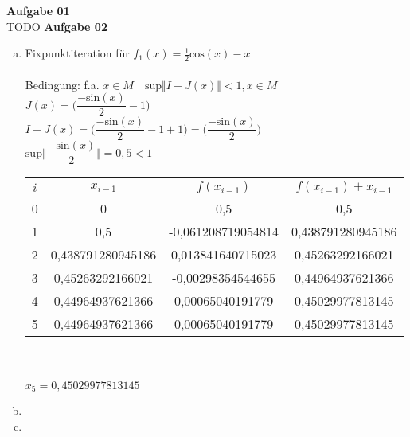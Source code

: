 \documentclass[a4paper,10pt]{article}
\begin{document}
	\parindent0pt
	\textbf{Aufgabe 01}\\
	TODO
	\newpage
	\textbf{Aufgabe 02}
	\begin{enumerate}[a)]
		\item Fixpunktiteration für $f_1(x) = \frac{1}{2} \mathrm{cos}(x) - x$\\\\
		Bedingung: f.a. $x \in M \quad \mathrm{sup}\Vert I + J(x) \Vert < 1, x \in M$\\
		$J(x) = \Big (\dfrac{-\mathrm{sin}(x)}{2} - 1 \Big)$\\
		$I + J(x) = \Big (\dfrac{-\mathrm{sin}(x)}{2} - 1 + 1 \Big) = \Big ( \dfrac{-\mathrm{sin}(x)}{2} \Big)$\\
		$\mathrm{sup} \Vert \dfrac{-\mathrm{sin}(x)}{2} \Vert = 0,5 < 1$\\

		\begin{tabular}{|c|c|c|c|}
			\hline 
			$i$& $x_{i-1}$ & $f(x_{i-1})$ & $f(x_{i-1}) + x_{i-1}$ \\ 
			\hline 
			0 & 0 & 0,5 & 0,5 \\ 
			\hline 
			1 & 0,5 & -0,061208719054814 & 0,438791280945186 \\
			\hline 
			2 &  0,438791280945186 & 0,013841640715023 & 0,45263292166021  \\
			\hline 
			3 & 0,45263292166021 & -0,00298354544655 & 0,44964937621366  \\
			\hline 
			4 & 0,44964937621366 & 0,00065040191779	& 0,45029977813145 \\
			\hline 
			5 & 0,44964937621366 & 0,00065040191779 & 0,45029977813145 \\
			\hline 
		\end{tabular} \\\\
		$x_5 = 0,45029977813145$
	
	
	
	
	
	
	
		\item 
		\item 
	\end{enumerate}
	
\end{document}
